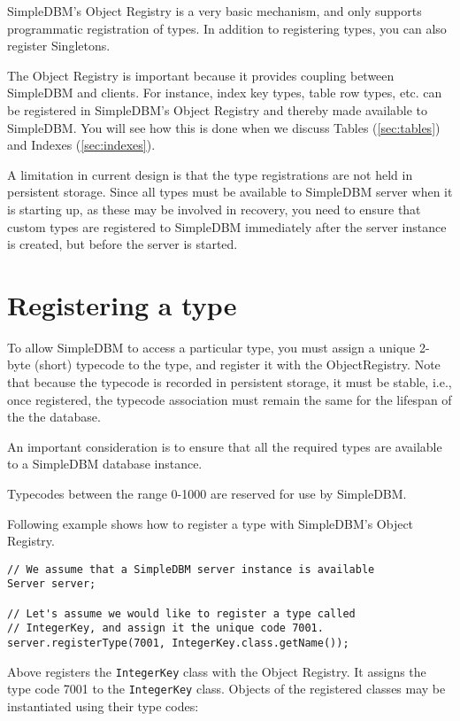 \documentclass[a4paper,draft,oneside]{book}
\begin{document}
SimpleDBM's Object Registry is a very basic mechanism, and only
supports programmatic registration of types. In addition to
registering types, you can also register Singletons.

The Object Registry is important because it provides
coupling between SimpleDBM and clients. For instance, index key
types, table row types, etc. can be registered in SimpleDBM's
Object Registry and thereby made available to SimpleDBM. You will
see how this is done when we discuss Tables (\ref{sec:tables}) and 
Indexes (\ref{sec:indexes}).

A limitation in current design is that the type registrations are
not held in persistent storage. Since all types must be available
to SimpleDBM server when it is starting up, as these may be involved
in recovery, you need to ensure that custom types are registered
to SimpleDBM immediately after the server instance is created, but 
before the server is started.

\section{Registering a type}
To allow SimpleDBM to access a particular type, you must assign a
unique 2-byte (short) typecode to the type, and register it with the
ObjectRegistry. Note that because the typecode is recorded in
persistent storage, it must be stable, i.e., once registered, the
typecode association must remain the same for the lifespan of the
the database. 

An important consideration is to ensure that all the required types
are available to a SimpleDBM database instance. 

Typecodes between the range 0-1000 are reserved for use by
SimpleDBM.

Following example shows how to register a type with SimpleDBM's Object
Registry.

\begin{verbatim}
// We assume that a SimpleDBM server instance is available
Server server;		

// Let's assume we would like to register a type called
// IntegerKey, and assign it the unique code 7001. 
server.registerType(7001, IntegerKey.class.getName());
\end{verbatim}

Above registers the \verb|IntegerKey| class with the Object Registry. It
assigns the type code 7001 to the \verb|IntegerKey| class. Objects of the
registered classes may be instantiated using their type codes:
\end{document}
